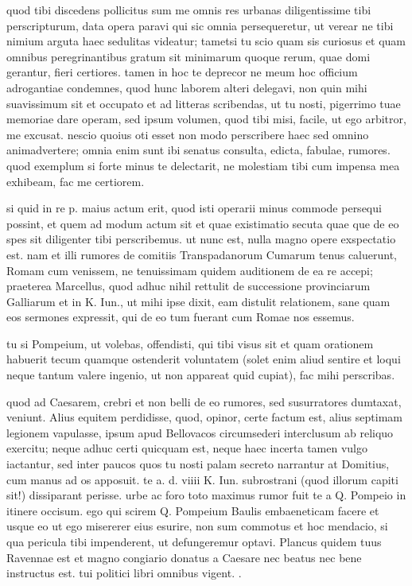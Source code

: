 


 quod tibi discedens pollicitus sum me omnis res urbanas diligentissime tibi perscripturum, data opera paravi qui sic omnia persequeretur, ut verear ne tibi nimium arguta haec sedulitas videatur; tametsi tu scio quam sis curiosus et quam omnibus peregrinantibus gratum sit minimarum quoque rerum, quae domi gerantur, fieri certiores. tamen in hoc te deprecor ne meum hoc officium adrogantiae condemnes, quod hunc laborem alteri delegavi, non quin mihi suavissimum sit et occupato et ad litteras scribendas, ut tu nosti, pigerrimo tuae memoriae dare operam, sed ipsum volumen, quod tibi misi, facile, ut ego arbitror, me excusat. nescio quoius oti esset non modo perscribere haec sed omnino animadvertere; omnia enim sunt ibi senatus consulta, edicta, fabulae, rumores. quod exemplum si forte minus te delectarit, ne molestiam tibi cum impensa mea exhibeam, fac me certiorem.

 si quid in re p. maius actum erit, quod isti operarii minus commode persequi possint, et quem ad modum actum sit et quae existimatio secuta quae que de eo spes sit diligenter tibi perscribemus. ut nunc est, nulla magno opere exspectatio est. nam et illi rumores de comitiis Transpadanorum Cumarum tenus caluerunt, Romam cum venissem, ne tenuissimam quidem auditionem de ea re accepi; praeterea Marcellus, quod adhuc nihil rettulit de successione provinciarum Galliarum et in K. Iun., ut mihi ipse dixit, eam distulit relationem, sane quam eos sermones expressit, qui de eo tum fuerant cum Romae nos essemus.

 tu si Pompeium, ut volebas, offendisti, qui tibi visus sit et quam orationem habuerit tecum quamque ostenderit voluntatem (solet enim aliud sentire et loqui neque tantum valere ingenio, ut non appareat quid cupiat), fac mihi perscribas.

 quod ad Caesarem, crebri et non belli de eo rumores, sed susurratores dumtaxat, veniunt. Alius equitem perdidisse, quod, opinor, certe factum est, alius septimam legionem vapulasse, ipsum apud Bellovacos circumsederi interclusum ab reliquo exercitu; neque adhuc certi quicquam est, neque haec incerta tamen vulgo iactantur, sed inter paucos quos tu nosti palam secreto narrantur at Domitius, cum manus ad os apposuit. te a. d. viiii K. Iun. subrostrani (quod illorum capiti sit!) dissiparant perisse. urbe ac foro toto maximus rumor fuit te a Q. Pompeio in itinere occisum. ego qui scirem Q. Pompeium Baulis embaeneticam facere et usque eo ut ego misererer eius esurire, non sum commotus et hoc mendacio, si qua pericula tibi impenderent, ut defungeremur optavi. Plancus quidem tuus Ravennae est et magno congiario donatus a Caesare nec beatus nec bene instructus est. tui politici libri omnibus vigent. .
